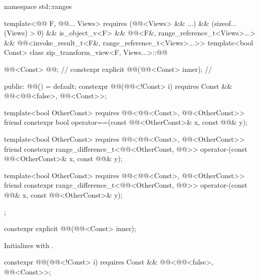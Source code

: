 \begin{codeblock}
namespace std::ranges {
  template<@@ F, @@... Views>
    requires (@@<Views> && ...) && (sizeof...(Views) > 0) && is_object_v<F> &&
              @@<F&, range_reference_t<Views>...> &&
              @@<invoke_result_t<F&, range_reference_t<Views>...>>
  template<bool Const>
  class zip_transform_view<F, Views...>::@@ {
    @@<Const> @@;                                     // \expos
    constexpr explicit @@(@@<Const> inner);         // \expos

  public:
    @@() = default;
    constexpr @@(@@<!Const> i)
      requires Const && @@<@@<false>, @@<Const>>;

    template<bool OtherConst>
      requires @@<@@<Const>, @@<OtherConst>>
    friend constexpr bool operator==(const @@<OtherConst>& x, const @@& y);

    template<bool OtherConst>
      requires @@<@@<Const>, @@<OtherConst>>
    friend constexpr range_difference_t<@@<OtherConst, @@>>
      operator-(const @@<OtherConst>& x, const @@& y);

    template<bool OtherConst>
      requires @@<@@<Const>, @@<OtherConst>>
    friend constexpr range_difference_t<@@<OtherConst, @@>>
      operator-(const @@& x, const @@<OtherConst>& y);
  };
}
\end{codeblock}

\begin{itemdecl}
constexpr explicit @@(@@<Const> inner);
\end{itemdecl}

\begin{itemdescr}
\pnum
\effects
Initializes  with .
\end{itemdescr}

\begin{itemdecl}
constexpr @@(@@<!Const> i)
  requires Const && @@<@@<false>, @@<Const>>;
\end{itemdecl}

